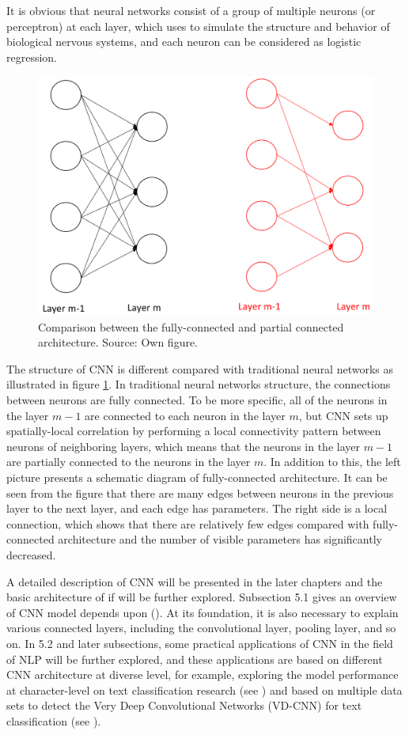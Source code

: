 \documentclass[]{krantz}
\begin{document}
It is obvious that neural networks consist of a group of multiple neurons (or perceptron) at each layer, which uses to simulate the structure and behavior of biological nervous systems, and each neuron can be considered as logistic regression.

\begin{figure}[h]

{\centering \includegraphics[width=0.5\linewidth]{figures/01-00-deep-learning-for-nlp/01_03_Comparison_Fully_Partial} 

}

\caption{Comparison between the fully-connected and partial connected architecture. Source: Own figure.}\label{fig:figintro2}
\end{figure}

The structure of CNN is different compared with traditional neural networks as illustrated in figure \ref{fig:figintro2}. In traditional neural networks structure, the connections between neurons are fully connected. To be more specific, all of the neurons in the layer \(m-1\) are connected to each neuron in the layer \(m\), but CNN sets up spatially-local correlation by performing a local connectivity pattern between neurons of neighboring layers, which means that the neurons in the layer \(m-1\) are partially connected to the neurons in the layer \(m\). In addition to this, the left picture presents a schematic diagram of fully-connected architecture. It can be seen from the figure that there are many edges between neurons in the previous layer to the next layer, and each edge has parameters. The right side is a local connection, which shows that there are relatively few edges compared with fully-connected architecture and the number of visible parameters has significantly decreased.

\newpage

A detailed description of CNN will be presented in the later chapters and the basic architecture of if will be further explored. Subsection 5.1 gives an overview of CNN model depends upon (\citet{Kim2014ConvolutionalNN}). At its foundation, it is also necessary to explain various connected layers, including the convolutional layer, pooling layer, and so on. In 5.2 and later subsections, some practical applications of CNN in the field of NLP will be further explored, and these applications are based on different CNN architecture at diverse level, for example, exploring the model performance at character-level on text classification research (see \citet{Zhang2015CharacterlevelCN}) and based on multiple data sets to detect the Very Deep Convolutional Networks (VD-CNN) for text classification (see \citet{Schwenk2017VeryDC}).
\end{document}
